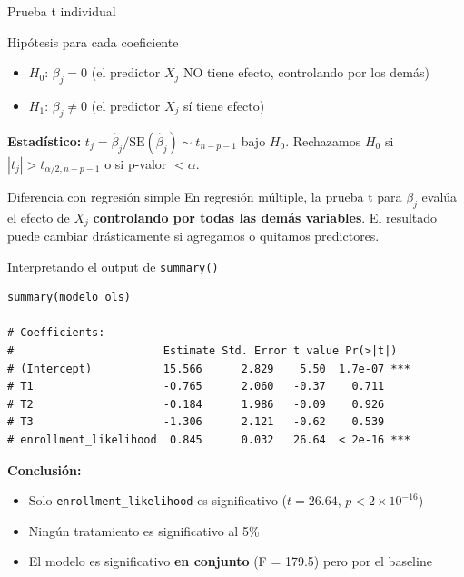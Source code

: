 \documentclass[aspectratio=169, 11pt]{beamer}
\begin{document}
\begin{frame}{Prueba t individual}
\begin{block}{Hipótesis para cada coeficiente}
\begin{itemize}
  \item $H_0$: $\beta_j = 0$ (el predictor $X_j$ NO tiene efecto, controlando por los demás)
  \item $H_1$: $\beta_j \neq 0$ (el predictor $X_j$ sí tiene efecto)
\end{itemize}
\end{block}

\vspace{0.1cm}
\textbf{Estadístico:}
$t_j = \hat{\beta}_j / \text{SE}(\hat{\beta}_j) \sim t_{n - p - 1}$ bajo $H_0$.
Rechazamos $H_0$ si $|t_j| > t_{\alpha/2, n-p-1}$ o si p-valor $< \alpha$.

\vspace{0.1cm}
\begin{alertblock}{Diferencia con regresión simple}
\small En regresión múltiple, la prueba t para $\beta_j$ evalúa el efecto de $X_j$ \textbf{controlando por todas las demás variables}. El resultado puede cambiar drásticamente si agregamos o quitamos predictores.
\end{alertblock}
\end{frame}

\begin{frame}[fragile]{Interpretando el output de \texttt{summary()}}
\begin{lstlisting}[basicstyle=\ttfamily\scriptsize]
summary(modelo_ols)

# Coefficients:
#                       Estimate Std. Error t value Pr(>|t|)
# (Intercept)           15.566      2.829    5.50  1.7e-07 ***
# T1                    -0.765      2.060   -0.37    0.711
# T2                    -0.184      1.986   -0.09    0.926
# T3                    -1.306      2.121   -0.62    0.539
# enrollment_likelihood  0.845      0.032   26.64  < 2e-16 ***
\end{lstlisting}

\vspace{0.2cm}
\textbf{Conclusión:}
\begin{itemize}
  \item Solo \texttt{enrollment\_likelihood} es significativo ($t = 26.64$, $p < 2 \times 10^{-16}$)
  \item Ningún tratamiento es significativo al 5\%
  \item El modelo es significativo \textbf{en conjunto} (F = 179.5) pero por el baseline
\end{itemize}
\end{frame}
\end{document}
